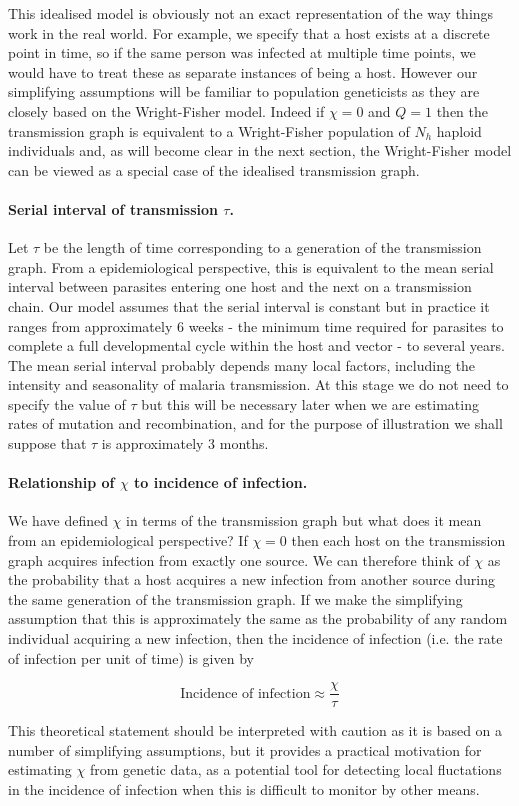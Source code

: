 \documentclass[_main.tex]{subfiles}
\begin{document}
This idealised model is obviously not an exact representation of the way things work in the real world.  For example, we specify that a host exists at a discrete point in time, so if the same person was infected at multiple time points, we would have to treat these as separate instances of being a host.  However our simplifying assumptions will be familiar to population geneticists as they are closely based on the Wright-Fisher model.  Indeed if $\chi=0$ and $Q = 1$ then the transmission graph is equivalent to a Wright-Fisher population of $N_h$ haploid individuals and, as will become clear in the next section, the Wright-Fisher model can be viewed as a special case of the idealised transmission graph.

\paragraph{Serial interval of transmission $\tau$.}  \label{main_serial_interval}  Let $\tau$ be the length of time corresponding to a generation of the transmission graph.  From a epidemiological perspective, this is equivalent to the mean serial interval between parasites entering one host and the next on a transmission chain.  Our model assumes that the serial interval is constant but in practice it ranges from approximately 6 weeks - the minimum time required for parasites to complete a full developmental cycle within the host and vector - to several years.  The mean serial interval probably depends many local factors, including the intensity and seasonality of malaria transmission. At this stage we do not need to specify the value of $\tau$ but this will be necessary later when we are estimating rates of mutation and recombination, and for the purpose of illustration we shall suppose that $\tau$ is approximately 3 months.

\paragraph{Relationship of $\chi$ to incidence of infection.} We have defined $\chi$ in terms of the transmission graph but what does it mean from an epidemiological perspective?  If $\chi = 0$ then each host on the transmission graph acquires infection from exactly one source.  We can therefore think of $\chi$ as the probability that a host acquires a new infection from another source during the same generation of the transmission graph.  If we make the simplifying assumption that this is approximately the same as the probability of any random individual acquiring a new infection, then the incidence of infection (i.e. the rate of infection per unit of time) is given by

\begin{equation}
\text{Incidence of infection} \approx \frac{\chi}{\tau}
\label{main:chi_tau} 
\end{equation}

This theoretical statement should be interpreted with caution as it is based on a number of simplifying assumptions, but it provides a practical motivation for estimating $\chi$ from genetic data, as a potential tool for detecting local fluctations in the incidence of infection when this is difficult to monitor by other means.
\end{document}
